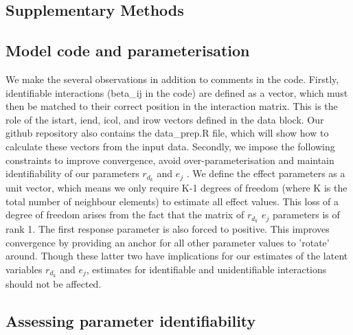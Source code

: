 \begin{refsection}

\section{Supplementary Methods}

\setcounter{figure}{0}

\label{SI:Methods}

    \subsection{Model code and parameterisation}
    \label{SI:modelcode}
    

    We make the several observations in addition to comments in the code. Firstly, identifiable interactions (beta\_ij in the code) are defined as a vector, which must then be matched to their correct position in the interaction matrix. This is the role of the istart, iend, icol, and irow vectors defined in the data block. Our github repository also contains the data\_prep.R file, which will show how to calculate these vectors from the input data. 
    Secondly, we impose the following constraints to improve convergence, avoid over-parameterisation and maintain identifiability of our parameters $r_{d_k}$ and $e_j$ \parencite{Huber2004, Kidzinski2020, Niku2021}. We define the effect parameters as a unit vector, which means we only require K-1 degrees of freedom (where K is the total number of neighbour elements) to estimate all effect values. This loss of a degree of freedom arises from the fact that the matrix of $r_{d_k}$ $e_j$ parameters is of rank 1. The first response parameter is also forced to positive. This improves convergence by providing an anchor for all other parameter values to 'rotate' around. Though these latter two have implications for our estimates of the latent variables $r_{d_k}$ and $e_j$, estimates for identifiable and unidentifiable interactions should not be affected.

    \subsection{Assessing parameter identifiability}
    \label{SI:identify}


\end{refsection}
